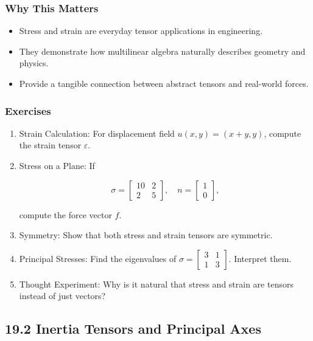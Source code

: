\documentclass[
  letterpaper,
  DIV=11,
  numbers=noendperiod]{scrreprt}
\providecommand{\tightlist}{%
  \setlength{\itemsep}{0pt}\setlength{\parskip}{0pt}}
\begin{document}
\subsubsection{Why This Matters}\label{why-this-matters-51}

\begin{itemize}
\tightlist
\item
  Stress and strain are everyday tensor applications in engineering.
\item
  They demonstrate how multilinear algebra naturally describes geometry
  and physics.
\item
  Provide a tangible connection between abstract tensors and real-world
  forces.
\end{itemize}

\subsubsection{Exercises}\label{exercises-65}

\begin{enumerate}
\def\labelenumi{\arabic{enumi}.}
\item
  Strain Calculation: For displacement field \(u(x,y) = (x+y, y)\),
  compute the strain tensor \(\varepsilon\).
\item
  Stress on a Plane: If

  \[
  \sigma = \begin{bmatrix} 10 & 2 \\ 2 & 5 \end{bmatrix}, \quad n = \begin{bmatrix} 1 \\ 0 \end{bmatrix},
  \]

  compute the force vector \(f\).
\item
  Symmetry: Show that both stress and strain tensors are symmetric.
\item
  Principal Stresses: Find the eigenvalues of
  \(\sigma = \begin{bmatrix} 3 & 1 \\ 1 & 3 \end{bmatrix}\). Interpret
  them.
\item
  Thought Experiment: Why is it natural that stress and strain are
  tensors instead of just vectors?
\end{enumerate}

\subsection{19.2 Inertia Tensors and Principal
Axes}\label{inertia-tensors-and-principal-axes}
\end{document}
